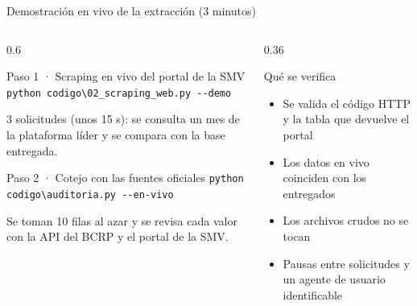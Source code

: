 \begin{frame}[fragile]{Demostración en vivo de la extracción (3 minutos)}
  \begin{columns}[t]
    \begin{column}{0.6\textwidth}
      \begin{tarjeta}{Paso 1 · Scraping en vivo del portal de la SMV}
\verb|python codigo\02_scraping_web.py --demo|\par\vspace{0.05cm}
        {\footnotesize 3 solicitudes (unos 15 s): se consulta un mes de la plataforma líder y se compara con la base entregada.}
      \end{tarjeta}
      \begin{tarjeta}{Paso 2 · Cotejo con las fuentes oficiales}
\verb|python codigo\auditoria.py --en-vivo|\par\vspace{0.05cm}
        {\footnotesize Se toman 10 filas al azar y se revisa cada valor con la API del BCRP y el portal de la SMV.}
      \end{tarjeta}
    \end{column}
    \begin{column}{0.36\textwidth}
      \begin{destacada}{Qué se verifica}
        \begin{itemize}\footnotesize
          \item Se valida el código HTTP y la tabla que devuelve el portal
          \item Los datos en vivo coinciden con los entregados
          \item Los archivos crudos no se tocan
          \item Pausas entre solicitudes y un agente de usuario identificable
        \end{itemize}
      \end{destacada}
    \end{column}
  \end{columns}
\end{frame}

